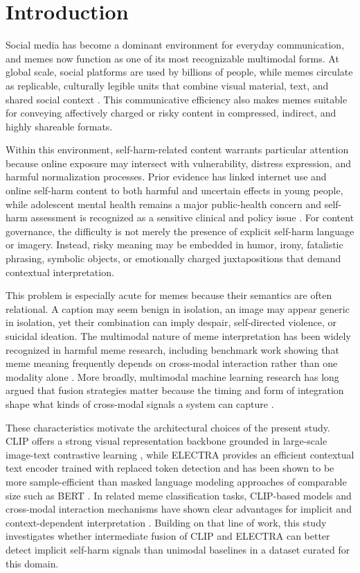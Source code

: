 \documentclass[pdflatex,sn-mathphys-num]{sn-jnl}%
\theoremstyle{thmstyleone}%
\theoremstyle{thmstyletwo}%
\theoremstyle{thmstylethree}%
\begin{document}
\section{Introduction}\label{sec1}

Social media has become a dominant environment for everyday communication, and memes now function as one of its most recognizable multimodal forms. At global scale, social platforms are used by billions of people, while memes circulate as replicable, culturally legible units that combine visual material, text, and shared social context \cite{bib1,bib2}. This communicative efficiency also makes memes suitable for conveying affectively charged or risky content in compressed, indirect, and highly shareable formats.

Within this environment, self-harm-related content warrants particular attention because online exposure may intersect with vulnerability, distress expression, and harmful normalization processes. Prior evidence has linked internet use and online self-harm content to both harmful and uncertain effects in young people, while adolescent mental health remains a major public-health concern and self-harm assessment is recognized as a sensitive clinical and policy issue \cite{bib3,bib4,bib5}. For content governance, the difficulty is not merely the presence of explicit self-harm language or imagery. Instead, risky meaning may be embedded in humor, irony, fatalistic phrasing, symbolic objects, or emotionally charged juxtapositions that demand contextual interpretation.

This problem is especially acute for memes because their semantics are often relational. A caption may seem benign in isolation, an image may appear generic in isolation, yet their combination can imply despair, self-directed violence, or suicidal ideation. The multimodal nature of meme interpretation has been widely recognized in harmful meme research, including benchmark work showing that meme meaning frequently depends on cross-modal interaction rather than one modality alone \cite{bib6,bib7}. More broadly, multimodal machine learning research has long argued that fusion strategies matter because the timing and form of integration shape what kinds of cross-modal signals a system can capture \cite{bib8}.

These characteristics motivate the architectural choices of the present study. CLIP offers a strong visual representation backbone grounded in large-scale image-text contrastive learning \cite{bib9}, while ELECTRA provides an efficient contextual text encoder trained with replaced token detection and has been shown to be more sample-efficient than masked language modeling approaches of comparable size such as BERT \cite{bib10,bib11}. In related meme classification tasks, CLIP-based models and cross-modal interaction mechanisms have shown clear advantages for implicit and context-dependent interpretation \cite{bib12,bib13}. Building on that line of work, this study investigates whether intermediate fusion of CLIP and ELECTRA can better detect implicit self-harm signals than unimodal baselines in a dataset curated for this domain.
\end{document}
